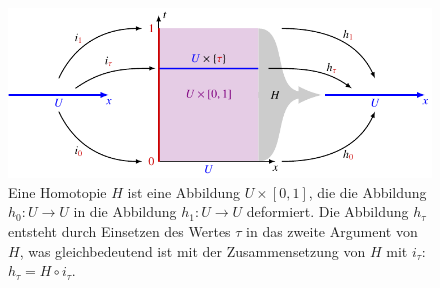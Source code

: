 %
%
%
\begin{figure}
\centering
\includegraphics{chapters/060-pformen/images/homotopie.pdf}
\caption{Eine Homotopie $H$ ist eine Abbildung $U\times[0,1]$, die
die Abbildung $h_0\colon U\to U$ in die Abbildung $h_1\colon U\to U$
deformiert.
Die Abbildung $h_{\tau}$ entsteht durch Einsetzen des Wertes $\tau$
in das zweite Argument von $H$, was gleichbedeutend ist mit der
Zusammensetzung von $H$ mit $i_\tau$: $h_\tau=H\circ i_\tau$.
\label{buch:pformen:fig:homotopie}}
\end{figure}
